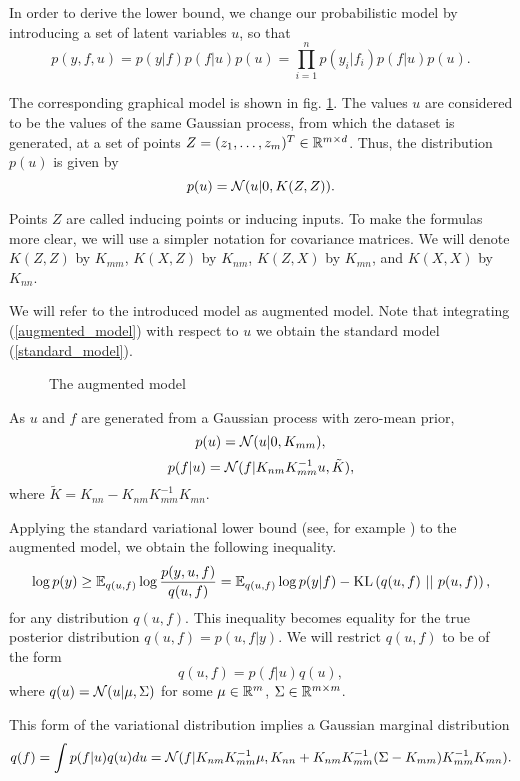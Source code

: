 In order to derive the lower bound, we change our probabilistic model by introducing a set of latent variables $u$, so that
\begin{equation}\label{augmented_model}
	p(y, f, u) = p(y | f) p(f | u) p(u) = \prod_{i = 1}^n p(y_i | f_i) p(f|u) p(u).
\end{equation}

The corresponding graphical model is shown in fig. \ref{inducing_inputs_gm}. The values $u$ are considered to be the values of the same Gaussian process, from which the dataset is generated, at a set of points $Z = (z_1, \ldots, z_m)^T \in \mathbb{R}^{m \times d}$. Thus, the distribution $p(u)$ is given by 
$$p(u) = \mathcal{N}(u|0, K(Z, Z)).$$

Points $Z$ are called inducing points or inducing inputs. To make the formulas more clear, we will use a simpler notation for covariance matrices. We will denote $K(Z, Z)$ by $K_{mm}$, $K(X, Z)$ by $K_{nm}$, $K(Z, X)$ by $K_{mn}$, and $K(X, X)$ by $K_{nn}$.

We will refer to the introduced model as augmented model. Note that integrating (\ref{augmented_model}) with respect to $u$ we obtain the standard model (\ref{standard_model}).

\begin{figure}[!h]
	\centering
	\scalebox{0.9}{
		
	}
	\caption{The augmented model}
	\label{inducing_inputs_gm}
\end{figure}

As $u$ and $f$ are generated from a Gaussian process with zero-mean prior, 
$$p(u) = \mathcal{N}(u|0, K_{mm}),$$
$$p(f|u) = \mathcal{N} (f|K_{nm} K_{mm}^{-1}u, \tilde K),$$
where $\tilde K = K_{nn} - K_{nm} K_{mm}^{-1} K_{mn}.$

Applying the standard variational lower bound (see, for example \cite{VarBayes}) to the augmented model, we obtain the following inequality.
$$\log p(y) \ge \mathbb{E}_{q(u, f)} \log \frac {p(y, u, f)}{q(u, f)} = \mathbb{E}_{q(u, f)}\log p(y | f) - \mbox{KL}\left(q(u, f)\mbox{ || }p(u, f)\right),$$
for any distribution $q(u, f)$. This inequality becomes equality for the true posterior distribution $q(u, f) = p(u, f | y)$. We will restrict $q(u, f)$ to be of the form
$$q(u, f) = p(f | u) q(u),$$
where $q(u) = \mathcal{N}(u | \mu, \Sigma)$ for some $\mu \in \mathbb{R}^m$, $\Sigma \in \mathbb{R}^{m \times m}$.

This form of the variational distribution implies a Gaussian marginal distribution
$$q(f) = \int p(f | u) q(u) du = \mathcal{N}(f| K_{nm} K_{mm}^{-1} \mu, K_{nn} + K_{nm} K_{mm}^{-1}(\Sigma - K_{mm}) K_{mm}^{-1} K_{mn}).$$

